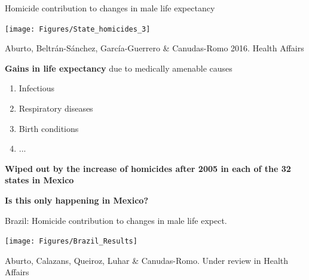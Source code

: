 \documentclass[xcolor={dvipsnames}]{beamer}
\begin{document}
\begin{frame}
	\begin{center}
\large{Homicide contribution to changes in male life expectancy}
	\end{center}


	\begin{center}
		\texttt{[image: Figures/State\_homicides\_3]}
	\end{center}
	
	\tiny{Aburto, Beltr\'an-S\'anchez, Garc\'ia-Guerrero \& Canudas-Romo 2016. Health Affairs}				
\end{frame}


\begin{frame}
	\LARGE{

		\begin{center}		
			\textbf{Gains in life expectancy} due to medically amenable causes
		\end{center}
		
		\begin{enumerate}
			\item Infectious
			\item Respiratory diseases 
			\item Birth conditions
			\item ...
		\end{enumerate}

	\pause

	\begin{center}
		\textbf{Wiped out by the increase of homicides after 2005 in each of the 32 states in Mexico}
	\end{center}				

}
\end{frame}


\begin{frame}
	\Huge{
	\begin{center}
		\bf{Is this only happening in Mexico?}
	\end{center}
	}
\end{frame}

\begin{frame}
	\begin{center}
		\large{Brazil: Homicide contribution to changes in male life expect.}
	\end{center}


	\begin{center}
		\texttt{[image: Figures/Brazil\_Results]}
	\end{center}
	
	\tiny{Aburto, Calazans, Queiroz, Luhar \& Canudas-Romo. Under review in Health Affairs}	
\end{frame}
\end{document}
